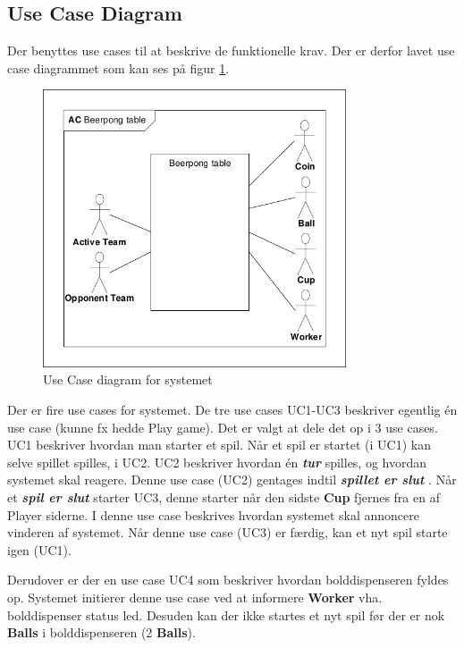 \documentclass[Kravspecifikation/Kravspec_Main.tex]{subfiles}
\begin{document}
\subsection{Use Case Diagram}
Der benyttes use cases til at beskrive de funktionelle krav. Der er derfor lavet use case diagrammet som kan ses på figur \ref{fig:Use_case}.
\begin{figure}[H]
    \centering
    \includegraphics[width=0.8\textwidth,trim={0.24in 0.24in 0.24in 0.24in},clip, page=2]{Kravspecifikation/Funktionelle_krav/graphics_funktionel/Krav-spec-diagrammer.pdf}
    \caption{Use Case diagram for systemet}
    \label{fig:Use_case}
\end{figure}
Der er fire use cases for systemet. De tre use cases UC1-UC3 beskriver egentlig én use case (kunne fx hedde Play game). Det er valgt at dele det op i 3 use cases. UC1 beskriver hvordan man starter et spil. Når et spil er startet (i UC1) kan selve spillet spilles, i UC2. UC2 beskriver hvordan én \textbf{\textit{tur}} spilles, og hvordan systemet skal reagere. Denne use case (UC2) gentages indtil \textbf{\textit{spillet er slut}} . Når et \textbf{\textit{spil er slut}} starter UC3, denne starter når den sidste \textbf{Cup} fjernes fra en af Player siderne. I denne use case beskrives hvordan systemet skal annoncere vinderen af systemet. Når denne use case (UC3) er færdig, kan et nyt spil starte igen (UC1). 

Derudover er der en use case UC4 som beskriver hvordan bolddispenseren fyldes op. Systemet initierer denne use case ved at informere \textbf{Worker} vha. bolddispenser status led. Desuden kan der ikke startes et nyt spil før der er nok \textbf{Balls} i bolddispenseren (2 \textbf{Balls}).

\newpage


\newpage

\newpage

\newpage

\newpage
\end{document}
